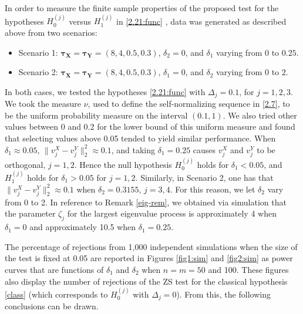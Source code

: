 \documentclass[11pt]{article}
\numberwithin{equation}{section}
\numberwithin{theorem}{section}
\numberwithin{lemma}{section}
\numberwithin{proposition}{section}
\numberwithin{cor}{section}
\numberwithin{definition}{section}
\numberwithin{cons}{section}
\numberwithin{rem}{section}
\numberwithin{exa}{section}
\numberwithin{table}{section}
\numberwithin{figure}{section}
\numberwithin{algo}{section}
\begin{document}
{{In order to measure the finite sample properties of the proposed test for the hypotheses $H^{(j)}_0$ versus $H^{(j)}_1$ in  \eqref{2.21:func} ,  data was generated as described above from two scenarios:
\begin{itemize}
\itemsep-.5ex
  \item Scenario 1: $\mathbf{\tau_X}= \mathbf{\tau_Y}= (8,4,0.5,0.3)$, $\delta_2=0$, and $\delta_1$ varying from $0$ to $0.25$.
  \item Scenario 2: $\mathbf{\tau_X}= \mathbf{\tau_Y}= (8,4,0.5,0.3)$, $\delta_1=0$, and $\delta_2$ varying from $0$ to $2$.
\end{itemize}

In both cases, we tested the  hypotheses  \eqref{2.21:func} with $\Delta_j=0.1$, for $j=1,2,3$. We took the measure $\nu$, used to define the self-normalizing sequence in \eqref{2.7}, to be the uniform probability measure on the interval $(0.1,1)$. We also tried other values between 0 and 0.2 for the lower bound of this uniform measure and found that selecting values above 0.05 tended to yield similar performance. When $\delta_1 \approx 0.05$, $\|v_j^X - v_j^Y\|^2_2 \approx 0.1$, and taking $\delta_1 = 0.25$ causes $v_j^X$ and $v_j^Y$ to be orthogonal, $j=1,2$.  Hence the null hypothesis $H^{(j)}_0$ holds for $\delta_1< 0.05$, and $H^{(j)}_1$ holds for $\delta_1>0.05$ for $j=1,2$. Similarly, in Scenario 2, one has that $\|v_j^X - v_j^Y\|^2_2 \approx 0.1$ when $\delta_2=0.3155$, $j=3,4$. For this reason, we let $\delta_2$ vary from $0$ to 2. In reference to Remark \ref{eig-rem}, we obtained via simulation that the parameter $\zeta_j$ for the largest eigenvalue process is approximately 4 when $\delta_1=0$ and approximately 10.5 when $\delta_1=0.25$.


The percentage of rejections from 1{,}000 independent simulations when the size of the test is fixed at 0.05 are reported in Figures \ref{fig1:sim} and \ref{fig2:sim} as power curves that are functions of $\delta_1$ and $\delta_2$ when $n=m=50$ and 100. These figures also display the number of rejections of the ZS test for the classical hypothesis \eqref{class} (which corresponds to $H^{(j)}_0$ with $\Delta_j=0$). From this, the following conclusions can be drawn.

}}
\end{document}
